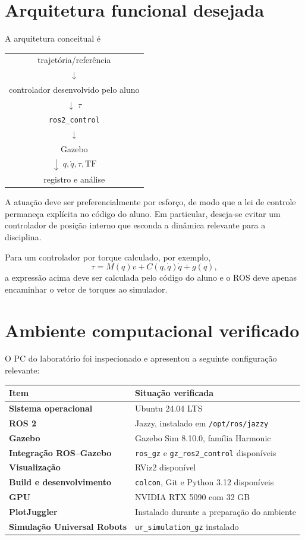 \documentclass[11pt,a4paper]{article}
\begin{document}
\section{Arquitetura funcional desejada}

A arquitetura conceitual é
\begin{center}
\begin{tabular}{c}
trajetória/referência \\
$\downarrow$ \\
controlador desenvolvido pelo aluno \\
$\downarrow\;\tau$ \\
\texttt{ros2\_control} \\
$\downarrow$ \\
Gazebo \\
$\downarrow\;q,\dot q,\tau,\text{TF}$ \\
registro e análise
\end{tabular}
\end{center}

A atuação deve ser preferencialmente por esforço, de modo que a lei de controle permaneça explícita no código do aluno. Em particular, deseja-se evitar um controlador de posição interno que esconda a dinâmica relevante para a disciplina.

Para um controlador por torque calculado, por exemplo,
\begin{equation}
\tau = M(q)v + C(q,\dot q)\dot q + g(q),
\end{equation}
a expressão acima deve ser calculada pelo código do aluno e o ROS deve apenas encaminhar o vetor de torques ao simulador.

\section{Ambiente computacional verificado}

O PC do laboratório foi inspecionado e apresentou a seguinte configuração relevante:

\begin{longtable}{>{\bfseries}p{}p{}}
\toprule
Item & Situação verificada \\
\midrule
Sistema operacional & Ubuntu 24.04 LTS \\
ROS 2 & Jazzy, instalado em \texttt{/opt/ros/jazzy} \\
Gazebo & Gazebo Sim 8.10.0, família Harmonic \\
Integração ROS--Gazebo & \texttt{ros\_gz} e \texttt{gz\_ros2\_control} disponíveis \\
Visualização & RViz2 disponível \\
Build e desenvolvimento & \texttt{colcon}, Git e Python 3.12 disponíveis \\
GPU & NVIDIA RTX 5090 com 32 GB \\
PlotJuggler & Instalado durante a preparação do ambiente \\
Simulação Universal Robots & \texttt{ur\_simulation\_gz} instalado \\
\bottomrule
\end{longtable}
\end{document}
